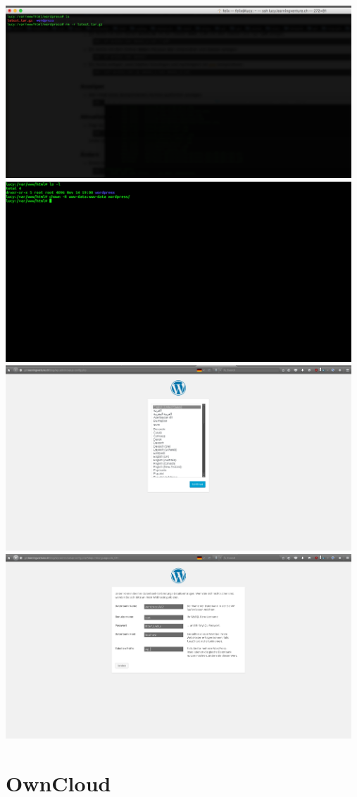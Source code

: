 \documentclass{article}
\begin{document}
	\newline
	\includegraphics[width=13cm]{../Pics/34-wordpress-download-file-remove}
	\newline
	\includegraphics[width=13cm]{../Pics/35-wordpress-permissions}
	\newline
	\includegraphics[width=13cm]{../Pics/36-wordpress-konfbildschirm}
	\newline
	\includegraphics[width=13cm]{../Pics/37-wordpress-datenbank}
	\newline
	\section{OwnCloud}
\end{document}
